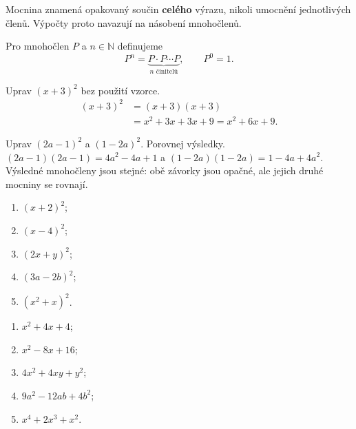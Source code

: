 \documentclass[11pt,a4paper]{article}
\begin{document}
Mocnina znamená opakovaný součin \textbf{celého} výrazu, nikoli umocnění jednotlivých členů. Výpočty proto navazují na násobení mnohočlenů.
\begin{definiceBox}[title={Definice - Mocnina mnohočlenu}]
Pro mnohočlen $P$ a $n\in\mathbb N$ definujeme
\[P^n=\underbrace{P\cdot P\cdots P}_{n\text{ činitelů}},\qquad P^0=1.\]
\end{definiceBox}
\begin{prikladReseniBox}[title={Příklad 1}]
Uprav $(x+3)^2$ bez použití vzorce.
\tcblower
\begin{align*}
(x+3)^2&=(x+3)(x+3)\\
&=x^2+3x+3x+9=x^2+6x+9.
\end{align*}
\end{prikladReseniBox}
\begin{prikladReseniBox}[title={Příklad 2}]
Uprav $(2a-1)^2$ a $(1-2a)^2$. Porovnej výsledky.
\tcblower
$(2a-1)(2a-1)=4a^2-4a+1$ a $(1-2a)(1-2a)=1-4a+4a^2$. Výsledné mnohočleny jsou stejné: obě závorky jsou opačné, ale jejich druhé mocniny se rovnají.
\end{prikladReseniBox}
\begin{zadaniReseniBox}[title={Samostatná práce 1}]
\begin{enumerate}[label=\alph*)]
\item $(x+2)^2$;
\item $(x-4)^2$;
\item $(2x+y)^2$;
\item $(3a-2b)^2$;
\item $(x^2+x)^2$.
\end{enumerate}
\tcblower
\begin{enumerate}[label=\alph*)]
\item $x^2+4x+4$;
\item $x^2-8x+16$;
\item $4x^2+4xy+y^2$;
\item $9a^2-12ab+4b^2$;
\item $x^4+2x^3+x^2$.
\end{enumerate}
\end{zadaniReseniBox}
\end{document}
